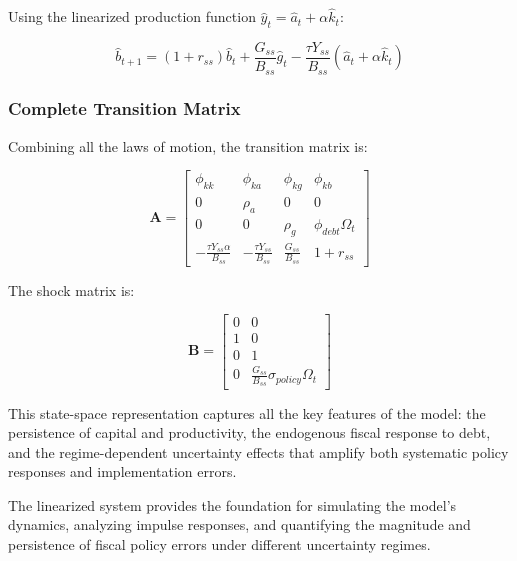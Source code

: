 \documentclass[5p,authoryear]{elsarticle}
\begin{document}
Using the linearized production function $\hat{y}_t = \hat{a}_t + \alpha \hat{k}_t$:

\begin{equation}
\hat{b}_{t+1} = (1 + r_{ss}) \hat{b}_t + \frac{G_{ss}}{B_{ss}} \hat{g}_t - \frac{\tau Y_{ss}}{B_{ss}} (\hat{a}_t + \alpha \hat{k}_t)
\label{eq:debt_law_detailed}
\end{equation}

\subsubsection{Complete Transition Matrix}

Combining all the laws of motion, the transition matrix is:

\begin{equation}
\mathbf{A} = \begin{bmatrix}
\phi_{kk} & \phi_{ka} & \phi_{kg} & \phi_{kb} \\
0 & \rho_a & 0 & 0 \\
0 & 0 & \rho_g & \phi_{debt} \Omega_t \\
-\frac{\tau Y_{ss} \alpha}{B_{ss}} & -\frac{\tau Y_{ss}}{B_{ss}} & \frac{G_{ss}}{B_{ss}} & 1 + r_{ss}
\end{bmatrix}
\label{eq:transition_matrix_complete}
\end{equation}

The shock matrix is:

\begin{equation}
\mathbf{B} = \begin{bmatrix}
0 & 0 \\
1 & 0 \\
0 & 1 \\
0 & \frac{G_{ss}}{B_{ss}} \sigma_{policy} \Omega_t
\end{bmatrix}
\label{eq:shock_matrix}
\end{equation}

This state-space representation captures all the key features of the model: the persistence of capital and productivity, the endogenous fiscal response to debt, and the regime-dependent uncertainty effects that amplify both systematic policy responses and implementation errors.

The linearized system provides the foundation for simulating the model's dynamics, analyzing impulse responses, and quantifying the magnitude and persistence of fiscal policy errors under different uncertainty regimes.

\end{document}
